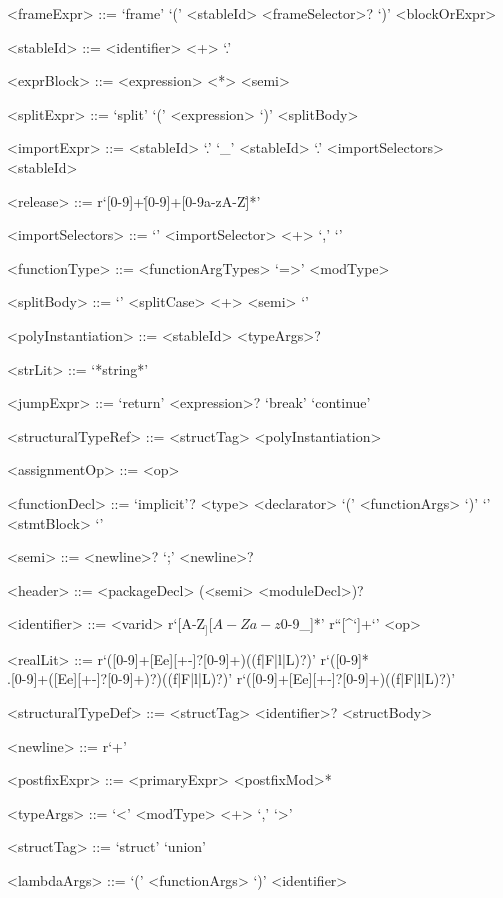 \documentclass[10pt,letterpaper]{article}
\begin{document}
\begin{grammar}
  <frameExpr> ::= `frame' `(' <stableId> <frameSelector>? `)' <blockOrExpr>
  
  <stableId> ::= <identifier> <+> `.'
  
  <exprBlock> ::= <expression> <*> <semi>
  
  <splitExpr> ::= `split' `(' <expression> `)' <splitBody>
  
  <importExpr> ::= <stableId> `.' `_'
    \alt <stableId> `.' <importSelectors>
    \alt <stableId>
  
  <release> ::= r`[0-9]+\.[0-9]+[0-9a-zA-Z\.]*'
  
  <importSelectors> ::= `{' <importSelector> <+> `,' `}'
  
  <functionType> ::= <functionArgTypes> `=>' <modType>
  
  <splitBody> ::= `{' <splitCase> <+> <semi> `}'
  
  <polyInstantiation> ::= <stableId> <typeArgs>?
  
  <strLit> ::= `*string*'
  
  <jumpExpr> ::= `return' <expression>?
    \alt `break'
    \alt `continue'
  
  <structuralTypeRef> ::= <structTag> <polyInstantiation>
  
  <assignmentOp> ::= <op>
  
  <functionDecl> ::= `implicit'? <type> <declarator> `(' <functionArgs> `)' `{' <stmtBlock> `}'
  
  <semi> ::= <newline>? `;' <newline>?
  
  <header> ::= <packageDecl> (<semi> <moduleDecl>)?
  
  <identifier> ::= <varid>
    \alt r`[A-Z$_][A-Za-z$0-9_]*'
    \alt r``[^`]+`'
    \alt <op>
  
  <realLit> ::= r`([0-9]+[Ee][+-]?[0-9]+)((f|F|l|L)?)'
    \alt r`([0-9]*\\.[0-9]+([Ee][+-]?[0-9]+)?)((f|F|l|L)?)'
    \alt r`([0-9]+[Ee][+-]?[0-9]+)((f|F|l|L)?)'
  
  <structuralTypeDef> ::= <structTag> <identifier>? <structBody>
  
  <newline> ::= r`\n+'
  
  <postfixExpr> ::= <primaryExpr> <postfixMod>*
  
  <typeArgs> ::= `<' <modType> <+> `,' `>'
  
  <structTag> ::= `struct'
    \alt `union'
  
  <lambdaArgs> ::= `(' <functionArgs> `)'
    \alt <identifier>
  

\end{grammar}
\end{document}
